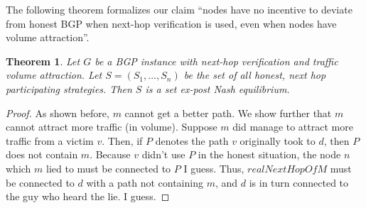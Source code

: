 \documentclass[12pt]{article}
\newtheorem{theorem}{Theorem}
\newtheorem{conjecture}{Conjecture}
\begin{document}
  The following theorem formalizes our claim ``nodes have no incentive
  to deviate from honest BGP when next-hop verification is used,
  even when nodes have volume attraction''.
  \begin{theorem}
    Let $G$ be a BGP instance with next-hop verification and traffic
    volume attraction.
    Let $S = (S_1, \ldots, S_n)$ be the set of all honest, next hop participating
    strategies. 
    Then $S$ is a set ex-post Nash equilibrium.
  \end{theorem}
  \begin{proof}
    As shown before, $m$ cannot get a better path. We show further
    that $m$ cannot attract more traffic (in volume).
    Suppose $m$ did manage to attract more traffic from a victim $v$.
    Then, if $P$ denotes the path $v$ originally took to $d$,
    then $P$ does not contain $m$. Because $v$ didn't use $P$
    in the honest situation, the node $n$ which $m$ lied to must
    be connected to $P$ I guess. Thus, $realNextHopOfM$
    must be connected to $d$ with a path not containing $m$,
    and $d$ is in turn connected to the guy who heard the lie.
    I guess.
  \end{proof}

\end{document}
